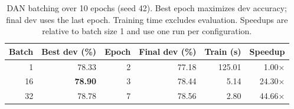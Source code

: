 \begin{table}[!ht]
\centering
\small
\caption{DAN batching over 10 epochs (seed 42). Best epoch maximizes dev accuracy; final dev uses the last epoch. Training time excludes evaluation. Speedups are relative to batch size 1 and use one run per configuration.}
\label{tab:batch-results}
\setlength{\tabcolsep}{4pt}
\renewcommand{\arraystretch}{1.1}
\begin{tabular}{rrrrrr}
\hline
Batch & Best dev (\%) & Epoch & Final dev (\%) & Train (s) & Speedup \\
\hline
1 & 78.33 & 2 & 77.18 & 125.01 & 1.00$\times$ \\
16 & \cellcolor{gray!20}\textbf{78.90} & 3 & 78.44 & 5.14 & 24.30$\times$ \\
32 & 78.78 & 7 & 78.56 & 2.80 & 44.66$\times$ \\
\hline
\end{tabular}
\end{table}
